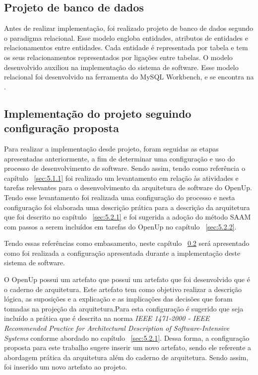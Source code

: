 \subsection{Projeto de banco de dados}
Antes de realizar implementação, foi realizado projeto de banco de dados segundo o paradigma relacional. Esse modelo engloba entidades, atributos de entidades e relacionamentos entre  entidades. Cada entidade é representada por tabela e tem os seus relacionamentos representados por ligações entre tabelas. O modelo desenvolvido auxiliou na implementação do sistema de software. Esse modelo relacional foi desenvolvido na ferramenta do MySQL Workbench, e se encontra na  .


%


\subsection{Implementação do projeto seguindo configuração proposta}
\label{sec:implementação}
Para realizar a implementação desde projeto, foram seguidas as etapas apresentadas anteriormente, a fim de determinar uma configuração e uso do processo de desenvolvimento de software.
Sendo assim, tendo como referência o capítulo  ~\ref{sec:5.1.1} foi realizado um levantamento em relação às atividades e tarefas relevantes para o desenvolvimento da arquitetura de software do \acrfull{OpenUp}. Tendo esse levantamento foi realizada uma configuração do processo e nesta configuração foi elaborada uma descrição prática para a descrição da arquitetura que foi descrito no capítulo ~\ref{sec:5.2.1} e foi sugerida a adoção do método \acrfull{SAAM} com passos a serem incluídos em tarefas do \acrfull{OpenUp} no capítulo ~\ref{sec:5.2.2}. 

Tendo essas referências como embasamento, neste capítulo ~\ref{sec:implementação} será apresentado como foi realizada a configuração apresentada durante a implementação deste sistema de software.

O \acrfull{OpenUp} possui um artefato que possui um artefato que foi desenvolvido que é o caderno de arquitetura. Este artefato tem como objetivo realizar a descrição lógica, as suposições e a explicação e as implicações das decisões que foram tomadas na projeção da arquitetura\cite{openup}.Para esta configuração é sugerido que seja incluído a prática que é descrita na norma \emph{IEEE 1471-2000 - IEEE Recommended Practice for Architectural Description of Software-Intensive Systems} conforme abordado no capítulo ~\ref{sec:5.2.1}. Dessa forma, a configuração proposta para este trabalho sugere inserir um novo artefato, sendo ele referente a abordagem prática da arquitetura além do caderno de arquitetura. Sendo assim, foi inserido um novo artefato ao projeto.

